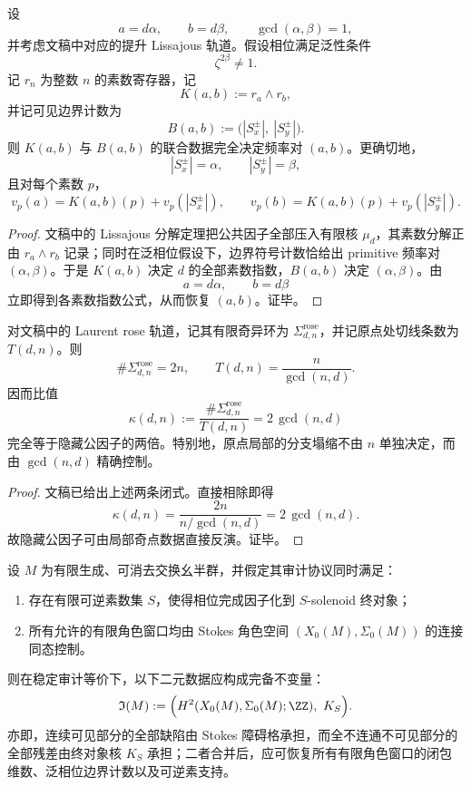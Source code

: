 \begin{theorem}\label{thm:conclusion-generic-phase-lissajous-complete-recovery}
设
\[
a=d\alpha,\qquad b=d\beta,\qquad \gcd(\alpha,\beta)=1,
\]
并考虑文稿中对应的提升 Lissajous 轨道。假设相位满足泛性条件
\[
\zeta^{2\beta}\neq 1.
\]
记 \(r_n\) 为整数 \(n\) 的素数寄存器，记
\[
K(a,b):=r_a\wedge r_b,
\]
并记可见边界计数为
\[
B(a,b):=\bigl(|S_x^{\pm}|,\ |S_y^{\pm}|\bigr).
\]
则 \(K(a,b)\) 与 \(B(a,b)\) 的联合数据完全决定频率对 \((a,b)\)。更确切地，
\[
|S_x^{\pm}|=\alpha,\qquad |S_y^{\pm}|=\beta,
\]
且对每个素数 \(p\)，
\[
v_p(a)=K(a,b)(p)+v_p(|S_x^{\pm}|),
\qquad
v_p(b)=K(a,b)(p)+v_p(|S_y^{\pm}|).
\]
\end{theorem}
\begin{proof}
文稿中的 Lissajous 分解定理把公共因子全部压入有限核 \(\mu_d\)，其素数分解正由 \(r_a\wedge r_b\) 记录；同时在泛相位假设下，边界符号计数恰给出 primitive 频率对 \((\alpha,\beta)\)。于是 \(K(a,b)\) 决定 \(d\) 的全部素数指数，\(B(a,b)\) 决定 \((\alpha,\beta)\)。由
\[
a=d\alpha,\qquad b=d\beta
\]
立即得到各素数指数公式，从而恢复 \((a,b)\)。证毕。
\end{proof}

\begin{proposition}\label{prop:conclusion-laurent-rose-gcd-collapse-index}
对文稿中的 Laurent rose 轨道，记其有限奇异环为 \(\Sigma_{d,n}^{\mathrm{rose}}\)，并记原点处切线条数为 \(T(d,n)\)。则
\[
\#\Sigma_{d,n}^{\mathrm{rose}}=2n,
\qquad
T(d,n)=\frac{n}{\gcd(n,d)}.
\]
因而比值
\[
\kappa(d,n):=
\frac{\#\Sigma_{d,n}^{\mathrm{rose}}}{T(d,n)}
=
2\,\gcd(n,d)
\]
完全等于隐藏公因子的两倍。特别地，原点局部的分支塌缩不由 \(n\) 单独决定，而由 \(\gcd(n,d)\) 精确控制。
\end{proposition}
\begin{proof}
文稿已给出上述两条闭式。直接相除即得
\[
\kappa(d,n)=\frac{2n}{n/\gcd(n,d)}=2\,\gcd(n,d).
\]
故隐藏公因子可由局部奇点数据直接反演。证毕。
\end{proof}

\begin{conjecture}\label{conj:conclusion-stokes-solenoid-double-interface-completeness}
设 \(M\) 为有限生成、可消去交换幺半群，并假定其审计协议同时满足：
\begin{enumerate}
  \item 存在有限可逆素数集 \(S\)，使得相位完成因子化到 \(S\)-solenoid 终对象；
  \item 所有允许的有限角色窗口均由 Stokes 角色空间 \((X_0(M),\Sigma_0(M))\) 的连接同态控制。
\end{enumerate}
则在稳定审计等价下，以下二元数据应构成完备不变量：
\[
\mathfrak I(M):=
\Bigl(
H^2(X_0(M),\Sigma_0(M);\ZZ),\ K_S
\Bigr).
\]
亦即，连续可见部分的全部缺陷由 Stokes 障碍格承担，而全不连通不可见部分的全部残差由终对象核 \(K_S\) 承担；二者合并后，应可恢复所有有限角色窗口的闭包维数、泛相位边界计数以及可逆素支持。
\end{conjecture}

